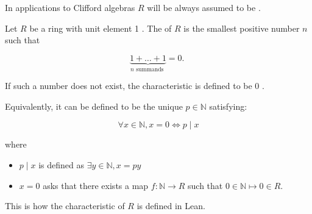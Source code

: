 \begin{remark}
    \label{mk:CommRing}

    In applications to Clifford algebras $R$ will be always assumed to be .
    
\end{remark}

\begin{definition}[Characteristic]
    \label{ringChar}
    \leanok

    Let $R$ be a ring with unit element 1 . The  of $R$ is the smallest positive number $n$ such that

    $$
    \underbrace{1+\ldots+1}_{n \text { summands }}=0 \text {. }
    $$
    
    If such a number does not exist, the characteristic is defined to be 0 .

\end{definition}

\begin{remark}
    \label{mk:characteristic}

    Equivalently, it can be defined to be the unique $p \in \mathbb{N}$ satisfying:

    $$
    \forall x \in \mathbb{N}, x = 0 \iff p \mid x
    $$

    where
    
    \begin{itemize}

        \item $p \mid x$ is defined as $\exists y \in \mathbb{N}, x = p y$
    
        \item $x = 0$ asks that there exists a map $f : \mathbb{N} \to R$ such that $0 \in \mathbb{N} ↦ 0 \in R$.
        
    \end{itemize}

    This is how the characteristic of $R$ is defined in Lean.

\end{remark}

